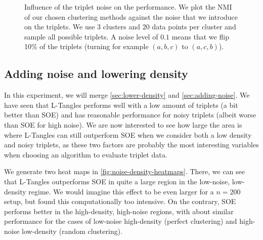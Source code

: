 \begin{figure}[ht]
    \centering
    \resizebox{0.7\textwidth}{!}{}
    \caption{
        Influence of the triplet noise on the performance.
        We plot the NMI of our chosen clustering methods against the noise that we introduce on 
        the triplets.
        We use $3$ clusters and $20$ data points per cluster and sample all possible triplets. A noise level of $0.1$ means that we flip 10\% of the triplets (turning for example $(a,b,c)$ to $(a,c,b)$). 
    }
    \label{fig:adding-noise}
\end{figure}

\subsection{Adding noise and lowering density}
In this experiment, we will merge \autoref{sec:lower-density} and \autoref{sec:adding-noise}. We have seen that L-Tangles performs well with a low
amount of triplets (a bit better than SOE) and has reasonable performance for noisy triplets (albeit worse than SOE for high noise). We are now interested to see how large the area is
where L-Tangles can still outperform SOE when we consider both a low density and noisy triplets, as these two factors are probably the most interesting variables
when choosing an algorithm to evaluate triplet data. 

We generate two heat maps in \autoref{fig:noise-density-heatmaps}. 
There, we can see that L-Tangles outperforms SOE in quite a large region in the low-noise, low-density regime. We would imagine this effect to be even larger
for a $n=200$ setup, but found this computationally too intensive. On the contrary, SOE performs better in the high-density, high-noise regions, with about similar performance
for the cases of low-noise high-density (perfect clustering) and high-noise low-density (random clustering).

